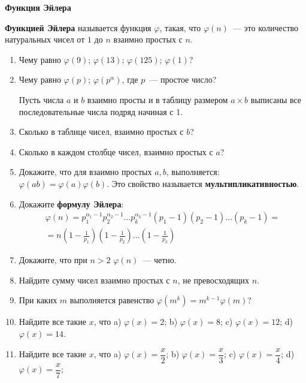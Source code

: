 \documentclass{article}
\begin{document}
\large
	
\begin{center}
	\textbf{Функция Эйлера}
\end{center}


\textbf{Функцией Эйлера} называется функция $\varphi$, такая, что $\varphi(n)$~--- это количество натуральных чисел от $1$ до $n$ взаимно простых с $n$.


\begin{enumerate}[label*=\protect\fbox{\arabic{enumi}}]

\item Чему равно $\varphi(9)$; $\varphi(13)$; $\varphi(125)$; $\varphi(1)$?

\item Чему равно $\varphi(p)$; $\varphi(p^\alpha)$, где $p$~--- простое число?


Пусть числа $a$ и $b$ взаимно просты и в таблицу размером $a \times b$ выписаны все последовательные числа подряд начиная с 1.

\item Сколько в таблице чисел, взаимно простых с $b$?
\item Сколько в каждом столбце чисел, взаимно простых с $a$?
\item Докажите, что для взаимно простых $a, b$, выполняется: $\varphi(ab) = \varphi(a)\varphi(b)$. Это свойство называется \textbf{мультипликативностью}.
\item Докажите \textbf{формулу Эйлера}:
\begin{align*}
	\varphi(n) = p_1^{\alpha_1 - 1}p_2^{\alpha_2 - 1}\ldots p_k^{\alpha_k - 1}(p_1 - 1)(p_2 - 1)\ldots (p_k - 1) =\\
	= n\left(1 - \frac{1}{p_1}\right)\left(1 - \frac{1}{p_2}\right)\ldots\left(1 - \frac{1}{p_k}\right)
\end{align*}

\item Докажите, что при $n > 2$ $\varphi(n)$~--- четно.

\item Найдите сумму чисел взаимно простых с $n$, не превосходящих $n$.

\item При каких $m$ выполняется равенство $\varphi(m^k) = m^{k - 1} \varphi(m)$?

\item Найдите все такие $x$, что a) $\varphi(x) = 2$;  b)  $\varphi(x) = 8$;  c) $\varphi(x) = 12$; d) $\varphi(x) = 14$.

\item Найдите все такие $x$, что a) $\varphi(x) = \dfrac{x}{2}$; b) $\varphi(x) = \dfrac{x}{3}$; c) $\varphi(x) = \dfrac{x}{4}$; d) $\varphi(x) = \dfrac{x}{7}$; 


\end{enumerate}
\end{document}
